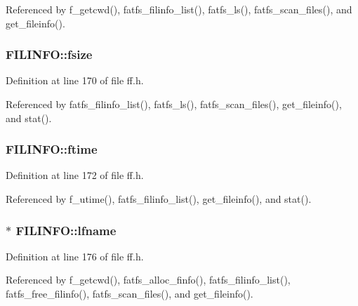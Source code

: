 Referenced by f\+\_\+getcwd(), fatfs\+\_\+filinfo\+\_\+list(), fatfs\+\_\+ls(), fatfs\+\_\+scan\+\_\+files(), and get\+\_\+fileinfo().

\subsubsection[{\texorpdfstring{fsize}{fsize}}]{ F\+I\+L\+I\+N\+F\+O\+::fsize}\hypertarget{structFILINFO_aee7441af7dc0c443d1e1e6011cc7dcac}{}\label{structFILINFO_aee7441af7dc0c443d1e1e6011cc7dcac}


Definition at line 170 of file ff.\+h.



Referenced by fatfs\+\_\+filinfo\+\_\+list(), fatfs\+\_\+ls(), fatfs\+\_\+scan\+\_\+files(), get\+\_\+fileinfo(), and stat().

\subsubsection[{\texorpdfstring{ftime}{ftime}}]{ F\+I\+L\+I\+N\+F\+O\+::ftime}\hypertarget{structFILINFO_ae0f751b79621bf7b29669f177bbe6b9a}{}\label{structFILINFO_ae0f751b79621bf7b29669f177bbe6b9a}


Definition at line 172 of file ff.\+h.



Referenced by f\+\_\+utime(), fatfs\+\_\+filinfo\+\_\+list(), get\+\_\+fileinfo(), and stat().

\subsubsection[{\texorpdfstring{lfname}{lfname}}]{$\ast$ F\+I\+L\+I\+N\+F\+O\+::lfname}\hypertarget{structFILINFO_ac4506c29e0219130dff46b01a1b5c023}{}\label{structFILINFO_ac4506c29e0219130dff46b01a1b5c023}


Definition at line 176 of file ff.\+h.



Referenced by f\+\_\+getcwd(), fatfs\+\_\+alloc\+\_\+finfo(), fatfs\+\_\+filinfo\+\_\+list(), fatfs\+\_\+free\+\_\+filinfo(), fatfs\+\_\+scan\+\_\+files(), and get\+\_\+fileinfo().

